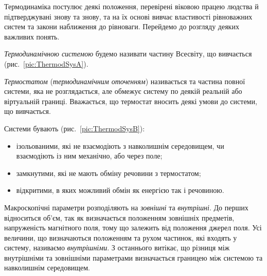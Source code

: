 Термодинаміка постулює деякі положення, перевірені віковою працею людства й підтверджувані знову та знову, та на їх основі вивчає властивості рівноважних систем та закони наближення до рівноваги. Перейдемо до розгляду деяких важливих понять.

\emph{Термодинамічною системою} будемо називати частину Всесвіту, що вивчається (рис.~\ref{pic:ThermodSysA}).



\emph{Термостатом} (\emph{термодинамічним оточенням}) називається та частина повної системи, яка не розглядається, але обмежує систему по деякій реальній або віртуальній границі. Вважається, що термостат вносить деякі умови до системи, що вивчається.


Системи бувають (рис.~\ref{pic:ThermodSysB}):
\begin{itemize}
    \item ізольованими, які не взаємодіють з навколишнім середовищем, чи взаємодіють із ним механічно, або через поле;
    \item замкнутими, які не мають обміну речовини з термостатом;
    \item відкритими, в яких можливий обмін як енергією так і речовиною.
\end{itemize}


Макроскопічні параметри розподіляють на \emph{зовнішні} та \emph{внутрішні}. До перших відноситься об’єм, так як визначається положенням зовнішніх предметів, напруженість магнітного поля, тому що залежить від положення джерел поля. Усі величини, що визначаються положенням та рухом частинок, які входять у систему, називаємо \emph{внутрішніми}. З останнього витікає, що різниця між внутрішніми та зовнішніми параметрами визначається границею між системою та навколишнім середовищем.

